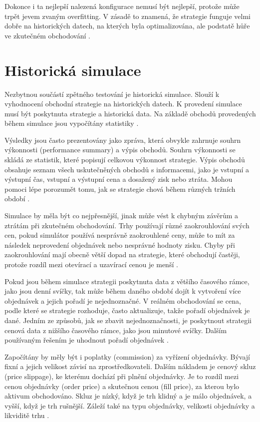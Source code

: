 Dokonce i ta nejlepší nalezená konfigurace nemusí být nejlepší, protože může trpět jevem zvaným overfitting.
V zásadě to znamená, že strategie funguje velmi dobře na historických datech, na kterých byla optimalizována, ale podstatě hůře ve zkutečném obchodování \cite{pardo}.


\section{Historická simulace}
Nezbytnou součástí zpětného testování je historická simulace.
Slouží k vyhodnocení obchodní strategie na historických datech.
K provedení simulace musí být poskytnuta strategie a historická data.
Na základě obchodů provedených během simulace jsou vypočítány statistiky \cite{pardo}.

Výsledky jsou často prezentovány jako zpráva, která obvykle zahrnuje souhrn výkonnosti (performance summary) a výpis obchodů.
Souhrn výkonnosti se skládá ze statistik, které popisují celkovou výkonnost strategie.
Výpis obchodů obsahuje seznam všech uskutečněných obchodů s informacemi, jako je vstupní a výstupní čas, vstupní a výstupní cena a dosažený zisk nebo ztráta.
Mohou pomoci lépe porozumět tomu, jak se strategie chová během různých tržních období \cite{pardo}.

Simulace by měla být co nejpřesnější, jinak může vést k chybným závěrům a ztrátám při zkutečném obchodování.
Trhy používají různé zaokrouhlování svých cen, pokud simulátor používá nesprávně zaokrouhlené ceny, může to mít za následek neprovedení objednávek nebo nesprávné hodnoty zisku.
Chyby při zaokrouhlování mají obecně větší dopad na strategie, které obchodují častěji, protože rozdíl mezi otevírací a uzavírací cenou je menší \cite{pardo}.

Pokud jsou během simulace strategii poskytnuta data z většího časového rámce, jako jsou denní svíčky, tak může během daného období dojít k vytvoření více objednávek a jejich pořadí je nejednoznačné.
V reálném obchodování se cena, podle které se strategie rozhoduje, často aktualizuje, takže pořadí objednávek je dané.
Jedním ze způsobů, jak se zbavit nejednoznačnosti, je poskytnout strategii cenová data z nižšího časového rámce, jako jsou minutové svíčky.
Dalším používaným řešením je uhodnout pořadí objednávek \cite{pardo}.

Započítány by měly být i poplatky (commission) za vyřízení objednávky.
Bývají fixní a jejich velikost závisí na zprostředkovateli.
Dalším nákladem je cenový skluz (price slippage), ke kterému dochází při plnění objednávky.
Je to rozdíl mezi cenou objednávky (order price) a skutečnou cenou (fill price), za kterou bylo aktivum obchodováno.
Skluz je nízký, když je trh klidný a je málo objednávek, a vyšší, když je trh rušnější.
Záleží také na typu objednávky, velikosti objednávky a likviditě trhu \cite{pardo}.

